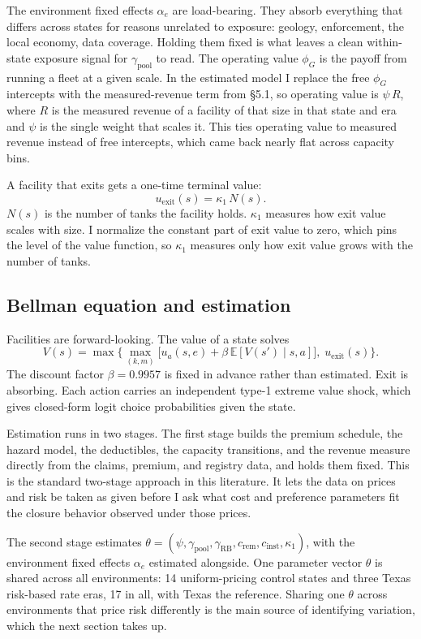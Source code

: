 \documentclass[
  12pt,
]{article}
\begin{document}
The environment fixed effects \(\alpha_e\) are load-bearing. They absorb
everything that differs across states for reasons unrelated to exposure:
geology, enforcement, the local economy, data coverage. Holding them
fixed is what leaves a clean within-state exposure signal for
\(\gamma_{\text{pool}}\) to read. The operating value \(\phi_G\) is the
payoff from running a fleet at a given scale. In the estimated model I
replace the free \(\phi_G\) intercepts with the measured-revenue term
from §5.1, so operating value is \(\psi\,R\), where \(R\) is the
measured revenue of a facility of that size in that state and era and
\(\psi\) is the single weight that scales it. This ties operating value
to measured revenue instead of free intercepts, which came back nearly
flat across capacity bins.

A facility that exits gets a one-time terminal value:
\[u_{\text{exit}}(s)=\kappa_1\,N(s).\] \(N(s)\) is the number of tanks
the facility holds. \(\kappa_1\) measures how exit value scales with
size. I normalize the constant part of exit value to zero, which pins
the level of the value function, so \(\kappa_1\) measures only how exit
value grows with the number of tanks.

\subsection{Bellman equation and
estimation}\label{bellman-equation-and-estimation}

Facilities are forward-looking. The value of a state solves
\[V(s)=\max\Big\{\max_{(k,m)}\big[u_a(s,e)+\beta\,\mathbb E[V(s')\mid s,a]\big],\;u_{\text{exit}}(s)\Big\}.\]
The discount factor \(\beta=0.9957\) is fixed in advance rather than
estimated. Exit is absorbing. Each action carries an independent type-1
extreme value shock, which gives closed-form logit choice probabilities
given the state.

Estimation runs in two stages. The first stage builds the premium
schedule, the hazard model, the deductibles, the capacity transitions,
and the revenue measure directly from the claims, premium, and registry
data, and holds them fixed. This is the standard two-stage approach in
this literature. It lets the data on prices and risk be taken as given
before I ask what cost and preference parameters fit the closure
behavior observed under those prices.

The second stage estimates
\(\theta=(\psi,\gamma_{\text{pool}},\gamma_{\text{RB}},c_{\text{rem}},c_{\text{inst}},\kappa_1)\),
with the environment fixed effects \(\alpha_e\) estimated alongside. One
parameter vector \(\theta\) is shared across all environments: 14
uniform-pricing control states and three Texas risk-based rate eras, 17
in all, with Texas the reference. Sharing one \(\theta\) across
environments that price risk differently is the main source of
identifying variation, which the next section takes up.
\end{document}

